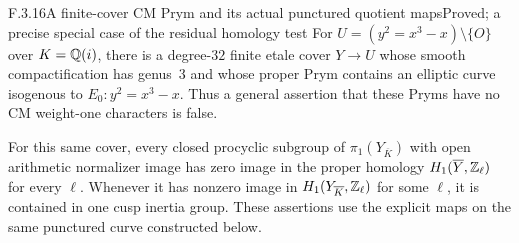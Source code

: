 \begin{result}{F.3.16}{A finite-cover CM Prym and its actual punctured quotient maps}{Proved; a precise special case of the residual homology test}
For $U=(y^2=x^3-x)\setminus\{O\}$ over $K=\mathbb Q(i)$, there is a degree-$32$ finite etale cover $Y\to U$ whose smooth compactification has genus~3 and whose proper Prym contains an elliptic curve isogenous to $E_0:y^2=x^3-x$. Thus a general assertion that these Pryms have no CM weight-one characters is false.

For this same cover, every closed procyclic subgroup of $\pi_1(Y_{\overline K})$ with open arithmetic normalizer image has zero image in the proper homology $H_1(\overline Y,\mathbb Z_\ell)$ for every $\ell$. Whenever it has nonzero image in $H_1(Y_{\overline K},\mathbb Z_\ell)$ for some $\ell$, it is contained in one cusp inertia group. These assertions use the explicit maps on the same punctured curve constructed below.
\end{result}
